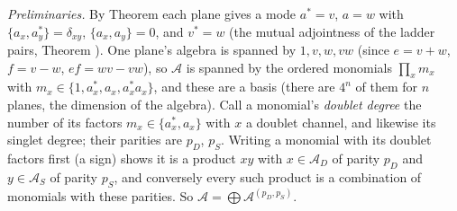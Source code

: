 \emph{Preliminaries.} By Theorem  each plane gives a mode $a^{*} = v$, $a = w$ with $\{a_{x}, a_{y}^{*}\} = \delta_{xy}$, $\{a_{x}, a_{y}\} = 0$, and $v^{*} = w$ (the mutual adjointness of the ladder pairs, Theorem ). One plane's algebra is spanned by $1, v, w, vw$ (since $e = v + w$, $f = v - w$, $ef = wv - vw$), so $\mathcal{A}$ is spanned by the ordered monomials $\prod_{x}m_{x}$ with $m_{x} \in \{1, a_{x}^{*}, a_{x}, a_{x}^{*}a_{x}\}$, and these are a basis (there are $4^{n}$ of them for $n$ planes, the dimension of the algebra). Call a monomial's \emph{doublet degree} the number of its factors $m_{x} \in \{a_{x}^{*}, a_{x}\}$ with $x$ a doublet channel, and likewise its singlet degree; their parities are $p_{D}$, $p_{S}$. Writing a monomial with its doublet factors first (a sign) shows it is a product $xy$ with $x \in \mathcal{A}_{D}$ of parity $p_{D}$ and $y \in \mathcal{A}_{S}$ of parity $p_{S}$, and conversely every such product is a combination of monomials with these parities. So $\mathcal{A} = \bigoplus\mathcal{A}^{(p_{D}, p_{S})}$.

